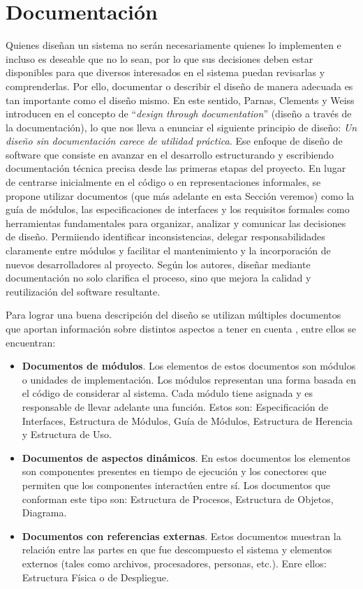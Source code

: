 \section{Documentación}

Quienes diseñan un sistema no serán necesariamente quienes lo implementen e incluso es deseable que no lo sean, por lo que sus decisiones deben estar disponibles para que diversos interesados en el sistema puedan revisarlas y comprenderlas. Por ello, documentar o describir el diseño de manera adecuada es tan importante como el diseño mismo. En este sentido, Parnas, Clements y Weiss introducen en el concepto de ``\textit{design through documentation}'' (diseño a través de la documentación), lo que nos lleva a enunciar el siguiente principio de diseño: \textit{Un diseño sin documentación carece de utilidad práctica.} Ese enfoque de diseño de software que consiste en avanzar en el desarrollo estructurando y escribiendo documentación técnica precisa desde las primeras etapas del proyecto. En lugar de centrarse inicialmente en el código o en representaciones informales, se propone utilizar documentos (que más adelante en esta Sección veremos) como la guía de módulos, las especificaciones de interfaces y los requisitos formales como herramientas fundamentales para organizar, analizar y comunicar las decisiones de diseño. Permiiendo identificar inconsistencias, delegar responsabilidades claramente entre módulos y facilitar el mantenimiento y la incorporación de nuevos desarrolladores al proyecto. Según los autores, diseñar mediante documentación no solo clarifica el proceso, sino que mejora la calidad y reutilización del software resultante.

Para lograr una buena descripción del diseño se utilizan múltiples documentos que aportan información sobre distintos aspectos a tener en cuenta \cite{ClementsEtAl2010}, entre ellos se encuentran:

\begin{itemize}
\item \textbf{Documentos de módulos}. Los elementos de estos documentos son módulos o unidades de implementación. Los módulos representan una forma basada en el código de considerar al sistema. Cada módulo tiene asignada y es responsable de llevar adelante una función. Estos son: Especificación de Interfaces, Estructura de Módulos, Guía de Módulos, Estructura de Herencia y Estructura de Uso.
\item \textbf{Documentos de aspectos dinámicos}. En estos documentos los elementos son componentes presentes en tiempo de ejecución y los conectores que permiten que los componentes interactúen entre sí. Los documentos que conforman este tipo son: Estructura de Procesos, Estructura de Objetos, Diagrama.
\item \textbf{Documentos con referencias externas}. Estos documentos muestran la relación entre las partes en que fue descompuesto el sistema y elementos externos (tales como archivos, procesadores, personas, etc.). Enre ellos: Estructura Física o de Despliegue.
\end{itemize}

